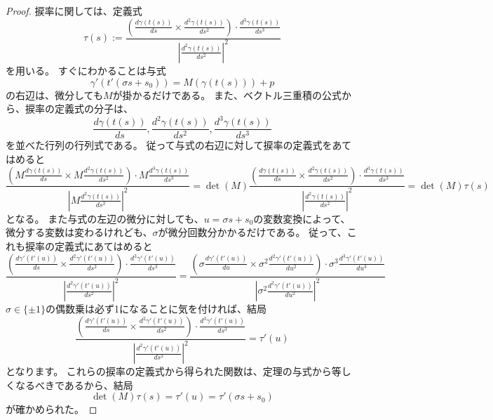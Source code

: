 \begin{proof}
  捩率に関しては、定義式
  \[
    \tau(s):=\frac{\left(\frac{d\gamma(t(s))}{ds}\times\frac{d^2\gamma(t(s))}{ds^2}\right)\cdot\frac{d^3\gamma(t(s))}{ds^3}}{\left|\frac{d^2\gamma(t(s))}{ds^2}\right|^2}
  \]
  を用いる。
  すぐにわかることは与式
  \[
    \gamma'(t'(\sigma s+s_0)) = M(\gamma(t(s))) + p
  \]
  の右辺は、微分しても$M$が掛かるだけである。
  また、ベクトル三重積の公式から、捩率の定義式の分子は、
  \[
    \frac{d\gamma(t(s))}{ds},\frac{d^2\gamma(t(s))}{ds^2},\frac{d^3\gamma(t(s))}{ds^3}
  \]
  を並べた行列の行列式である。
  従って与式の右辺に対して捩率の定義式をあてはめると
  \[
    \frac{\left(M\frac{d\gamma(t(s))}{ds}\times M\frac{d^2\gamma(t(s))}{ds^2}\right)\cdot M\frac{d^3\gamma(t(s))}{ds^3}}{\left|M\frac{d^2\gamma(t(s))}{ds^2}\right|^2}=\det(M)\frac{\left(\frac{d\gamma(t(s))}{ds}\times\frac{d^2\gamma(t(s))}{ds^2}\right)\cdot\frac{d^3\gamma(t(s))}{ds^3}}{\left|\frac{d^2\gamma(t(s))}{ds^2}\right|^2}=\det(M)\tau(s)
  \]
  となる。
  また与式の左辺の微分に対しても、$u=\sigma s+s_0$の変数変換によって、微分する変数は変わるけれども、$\sigma$が微分回数分かかるだけである。
  従って、これも捩率の定義式にあてはめると
  \[
    \frac{\left(\frac{d\gamma'(t'(u))}{ds}\times\frac{d^2\gamma'(t'(u))}{ds^2}\right)\cdot\frac{d^3\gamma'(t'(u))}{ds^3}}{\left|\frac{d^2\gamma'(t'(u))}{ds^2}\right|^2}=\frac{\left(\sigma\frac{d\gamma'(t'(u))}{du}\times\sigma^2\frac{d^2\gamma'(t'(u))}{du^2}\right)\cdot\sigma^3\frac{d^3\gamma'(t'(u))}{du^3}}{\left|\sigma^2\frac{d^2\gamma'(t'(u))}{du^2}\right|^2}
  \]
  $\sigma\in\{\pm1\}$の偶数乗は必ず1になることに気を付ければ、結局
  \[
    \frac{\left(\frac{d\gamma'(t'(u))}{ds}\times\frac{d^2\gamma'(t'(u))}{ds^2}\right)\cdot\frac{d^3\gamma'(t'(u))}{ds^3}}{\left|\frac{d^2\gamma'(t'(u))}{ds^2}\right|^2}=\tau'(u)
  \]
  となります。
  これらの捩率の定義式から得られた関数は、定理の与式から等しくなるべきであるから、結局
  \[
    \det(M)\tau(s)=\tau'(u)=\tau'(\sigma s+s_0)
  \]
  が確かめられた。
\end{proof}

